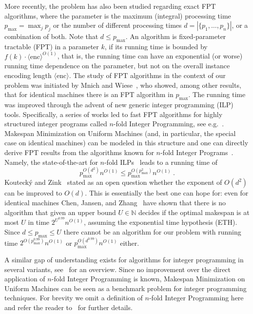 \documentclass{article}
\newcommand{\N}{\mathbb{N}}
\begin{document}
More recently, the problem has also been studied regarding exact FPT algorithms, where the
parameter is the maximum (integral) processing time $p_{\max} = \max_j p_j$ or
the number of different processing times $d = |\{p_1,\dotsc,p_n\}|$, or a combination of both.
Note that $d \le p_{\max}$. An algorithm is fixed-parameter tractable (FPT) in a parameter $k$,
if its running time is bounded by $f(k) \cdot \langle \mathrm{enc} \rangle^{O(1)}$, that is, the running time can have
an exponential (or worse) running time dependence on the parameter, but not on the overall instance encoding length $\langle \mathrm{enc} \rangle$.
The study of FPT algorithms in the context of our problem was initiated
by Mnich and Wiese~\cite{MnichW15}, who showed, among other results,
that for identical machines there is an FPT algorithm in $p_{\max}$.
The running time was improved through the advent of new generic integer programming (ILP) tools.
Specifically, a series of works led to fast FPT algorithms for highly structured integer programs called
$n$-fold Integer Programming, see e.g.~\cite{CslovjecsekEHRW21}. 
Makespan Minimization on Uniform Machines (and, in particular, the special case
on identical machines) can be modeled in this structure and one can directly derive FPT results from the algorithms
known for $n$-fold Integer Programs~\cite{KnopK18}. Namely, the state-of-the-art for $n$-fold ILPs~\cite{CslovjecsekEHRW21} leads
to a running time of
\begin{equation*}
	p_{\max}^{O(d^2)} n^{O(1)} \le p_{\max}^{O(p_{\max}^2)} n^{O(1)} \ .
\end{equation*}
Kouteck\'y and Zink~\cite{KouteckyZ20} stated as an open question whether the exponent of $O(d^2)$ can be improved to $O(d)$.
This is essentially the best one can hope for: even for identical machines
Chen, Jansen, and Zhang~\cite{chen2014optimality}
have shown that there is no algorithm that given an upper bound $U\in \N$ decides if the optimal makespan
is at most $U$ 
in time $2^{U^{0.99}} n^{O(1)}$, assuming the exponential time hypothesis (ETH).
Since $d \le p_{\max} \le U$ there cannot be an algorithm for our problem
with running time $2^{O(p_{\max}^{0.99})} n^{O(1)}$
or $p_{\max}^{O(d^{0.99})} n^{O(1)}$ either.

A similar gap of understanding exists for algorithms for integer programming in several variants, see~\cite{RohwedderW25} for an overview.
Since no improvement over the direct application of $n$-fold Integer Programming is known,
Makespan Minimization on Uniform Machines can be seen as a benchmark problem for integer
programming techniques. For brevity we omit a definition of $n$-fold Integer Programming here and refer the reader
to~\cite{CslovjecsekEHRW21} for further details.
\end{document}
